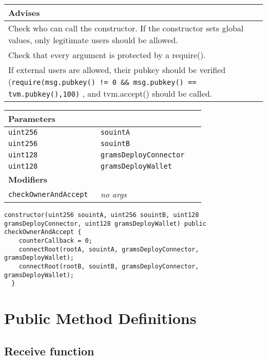 \ifsoldraft
\noindent\begin{tabular}{|p{12cm}|}\hline
\rowcolor{green}Advises
\\\hline
Check who can call the constructor. If the constructor sets global values, only legitimate users should be allowed.
\\\hline
Check that every argument is protected by a require().
\\\hline
If external users are allowed, their pubkey should be verified (\verb+require(msg.pubkey() != 0 && msg.pubkey() == tvm.pubkey(),100)+ , and tvm.accept() should be called.
\\\hline\end{tabular}
\fi

\ifsoltables
\noindent\begin{tabular}{|l|l|p{5cm}|}\hline
\multicolumn{3}{|l|}{\bf Parameters}\\\hline
\tt uint256 & \tt souintA &\\\hline
\tt uint256 & \tt souintB &\\\hline
\tt uint128 & \tt gramsDeployConnector &\\\hline
\tt uint128 & \tt gramsDeployWallet &\\\hline
\multicolumn{3}{|l|}{\bf Modifiers}\\\hline
\tt checkOwnerAndAccept & {\em no args} &\\\hline
\end{tabular}
\fi

\vspace{2cm}

\begin{lstlisting}[firstnumber=88]
  constructor(uint256 souintA, uint256 souintB, uint128 gramsDeployConnector, uint128 gramsDeployWallet) public checkOwnerAndAccept {
    counterCallback = 0;
    connectRoot(rootA, souintA, gramsDeployConnector, gramsDeployWallet);
    connectRoot(rootB, souintB, gramsDeployConnector, gramsDeployWallet);
  }
\end{lstlisting}

\section{Public Method Definitions}


\subsection{Receive function}

\vspace{2cm}

